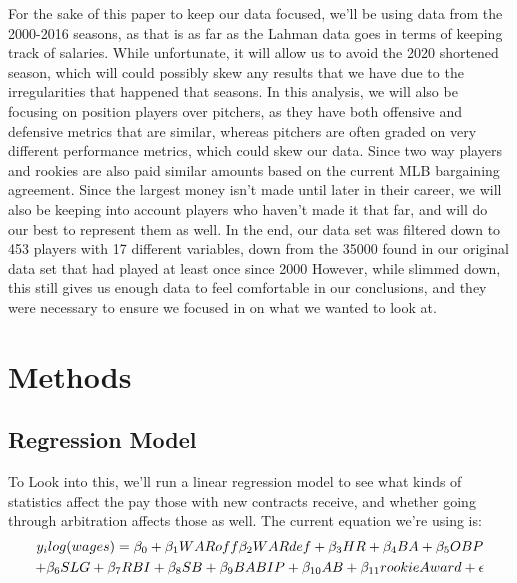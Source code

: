\documentclass{article}
\begin{document}
For the sake of this paper to keep our data focused, we'll be using data from the 2000-2016 seasons, as that is as far as the Lahman data goes in terms of keeping track of salaries. While unfortunate, it will allow us to avoid the 2020 shortened season, which will could possibly skew any results that we have due to the irregularities that happened that seasons. In this analysis, we will also be focusing on position players over pitchers, as they have both offensive and defensive metrics that are similar, whereas pitchers are often graded on very different performance metrics, which could skew our data. Since two way players and rookies are also paid similar amounts based on the current MLB bargaining agreement. Since the largest money isn't made until later in their career, we will also be keeping into account players who haven't made it that far, and will do our best to represent them as well. In the end, our data set was filtered down to 453 players with 17 different variables, down from the 35000 found in our original data set that had played at least once since 2000 However, while slimmed down, this still gives us enough data to feel comfortable in our conclusions, and they were necessary to ensure we focused in on what we wanted to look at.


\section{Methods}
\subsection{Regression Model}
To Look into this, we'll run a linear regression model to see what kinds of statistics affect the pay those with new contracts receive, and whether going through arbitration affects those as well. The current equation we're using is:
\begin{multline}
y_{i}log(wages)=\beta_{0}+\beta_{1}WARoff\beta_{2}WARdef+\beta_{3}HR+ \beta_{4}BA+\beta_{5}OBP\notag\\+\beta_{6}SLG+\beta_{7}RBI+
\beta_{8}SB+\beta_{9}BABIP+\beta_{10}AB+\beta_{11}rookieAward+\epsilon
\end{multline}
\end{document}
